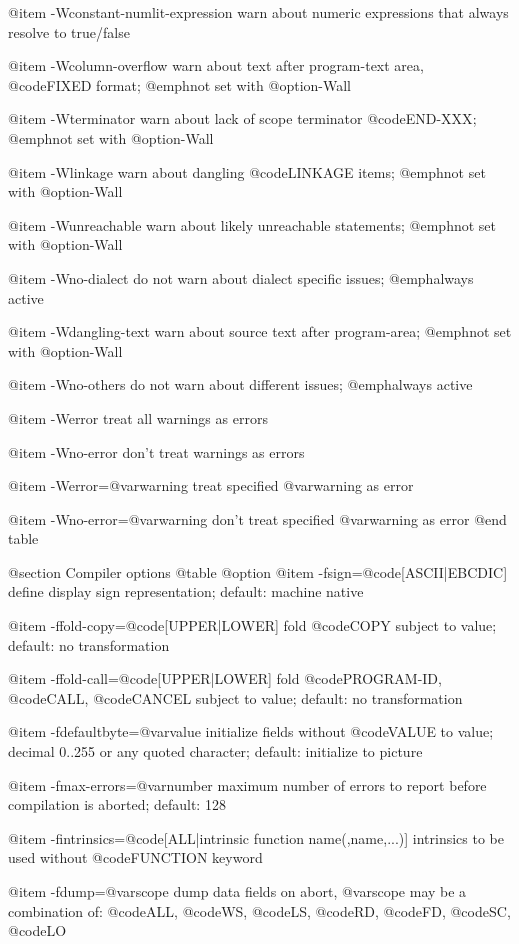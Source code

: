 @item -Wconstant-numlit-expression
warn about numeric expressions that always resolve to true/false

@item -Wcolumn-overflow
warn about text after program-text area, @code{FIXED} format; @emph{not} set with @option{-Wall}

@item -Wterminator
warn about lack of scope terminator @code{END-XXX}; @emph{not} set with @option{-Wall}

@item -Wlinkage
warn about dangling @code{LINKAGE} items; @emph{not} set with @option{-Wall}

@item -Wunreachable
warn about likely unreachable statements; @emph{not} set with @option{-Wall}

@item -Wno-dialect
do not warn about dialect specific issues; @emph{always} active

@item -Wdangling-text
warn about source text after program-area; @emph{not} set with @option{-Wall}

@item -Wno-others
do not warn about different issues; @emph{always} active

@item -Werror
treat all warnings as errors

@item -Wno-error
don't treat warnings as errors

@item -Werror=@var{warning}
treat specified @var{warning} as error

@item -Wno-error=@var{warning}
don't treat specified @var{warning} as error
@end table

@section Compiler options
@table @option
@item -fsign=@code{[ASCII|EBCDIC]}
define display sign representation; default: machine native

@item -ffold-copy=@code{[UPPER|LOWER]}
fold @code{COPY} subject to value; default: no transformation

@item -ffold-call=@code{[UPPER|LOWER]}
fold @code{PROGRAM-ID}, @code{CALL}, @code{CANCEL} subject to value; default: no transformation

@item -fdefaultbyte=@var{value}
initialize fields without @code{VALUE} to value; decimal 0..255 or any quoted character; default: initialize to picture

@item -fmax-errors=@var{number}
maximum number of errors to report before
compilation is aborted; default: 128

@item -fintrinsics=@code{[ALL}|intrinsic function name(,name,...)]
intrinsics to be used without @code{FUNCTION} keyword

@item -fdump=@var{scope}
dump data fields on abort, @var{scope} may be
a combination of: @code{ALL}, @code{WS}, @code{LS}, @code{RD}, @code{FD}, @code{SC}, @code{LO}


